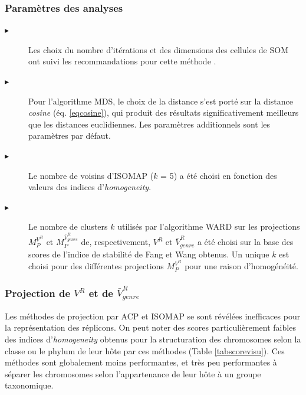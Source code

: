 \subsubsection{Paramètres des analyses}
 \begin{description}
\item[$\blacktriangleright$] Les choix du nombre d'itérations et des dimensions des cellules de SOM ont suivi les recommandations pour cette méthode \citep{wendel2010formalizing}.
\item[$\blacktriangleright$] Pour l’algorithme MDS, le choix de la distance s’est porté sur la distance \textit{cosine} (éq. \ref{eqcosine}), qui produit des résultats significativement meilleurs que les distances euclidiennes. Les paramètres additionnels sont les paramètres par défaut. 
\item[$\blacktriangleright$] Le nombre de voisins d'ISOMAP ($k$ = 5) a été choisi en fonction des valeurs des indices d'\textit{homogeneity}.
\item[$\blacktriangleright$] Le nombre de clusters $k$ utilisés par l'algorithme WARD sur les projections $M^{V^{R}}_{P}$ et $M^{\bar{V}_{genre}^{R}}_{P}$ de, respectivement, $V^{R}$ et $\bar{V}_{genre}^{R}$ a été choisi sur la base des scores de l'indice de stabilité de Fang et Wang obtenus. Un unique $k$ est choisi pour des différentes projections $M^{V^{R}}_{P}$ pour une raison d'homogénéité.
 \end{description}
 
 \subsubsection{Projection de $V^{R}$ et de $\bar{V}_{genre}^{R}$}
   Les méthodes de projection par ACP et ISOMAP se sont révélées inefficaces pour la représentation des réplicons. On peut noter des scores particulièrement faibles des indices d'\textit{homogeneity} obtenus pour la structuration des chromosomes selon la classe ou le phylum de leur hôte par ces méthodes (Table \ref{tabscorevisu}). Ces méthodes sont globalement moins performantes, et très peu performantes à séparer les chromosomes selon l'appartenance de leur hôte à un groupe taxonomique.

